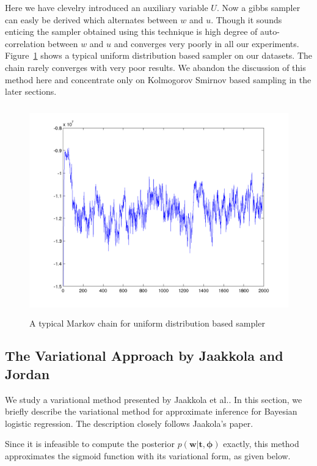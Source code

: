 Here we have clevelry introduced an auxiliary variable $U$.
Now a gibbs sampler can easly be derived which alternates between $w$ and $u$.
Though it sounds enticing the sampler obtained using this technique is high
degree of auto-correlation between $w$ and $u$ and converges very poorly in all
our experiments. Figure~\ref{fig:uniformSamplerChain} shows a typical uniform
distribution based sampler on our datasets. The chain rarely converges with very
poor results. We abandon the discussion of this method here and
concentrate only on Kolmogorov Smirnov based sampling in the later sections.

\begin{figure}[t]
\label{fig:laplace}
\centering
\includegraphics[height=9.0cm]{results/uniformSampleChain.png}

\caption{A typical Markov chain for uniform distribution based sampler }

\label{fig:uniformSamplerChain}
\end{figure}




\subsection{The Variational Approach by Jaakkola and Jordan}
We study a variational method presented by Jaakkola et al.\cite{Jaakkola96avariational}. In this section, we briefly describe the variational method for approximate inference for Bayesian logistic regression. The description closely follows Jaakola's paper.

Since it is infeasible to compute the posterior $p(\bm{w} | \bm{t}, \bm{\phi})$ exactly, this method approximates the sigmoid function with its variational form, as given below.

